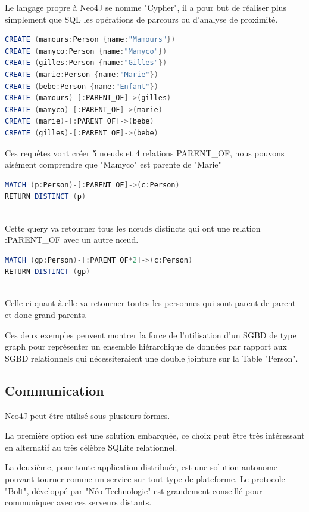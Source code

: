 \documentclass[a4paper,fleqn,12pt]{report}
\begin{document}
Le langage propre à Neo4J se nomme "Cypher"\label{Cypher}, il a pour but de réaliser plus simplement que SQL les opérations de parcours ou d'analyse de proximité.

\begin{lstlisting}[language=java, frame=single]
CREATE (mamours:Person {name:"Mamours"})
CREATE (mamyco:Person {name:"Mamyco"})
CREATE (gilles:Person {name:"Gilles"})
CREATE (marie:Person {name:"Marie"})
CREATE (bebe:Person {name:"Enfant"})
CREATE (mamours)-[:PARENT_OF]->(gilles)
CREATE (mamyco)-[:PARENT_OF]->(marie)
CREATE (marie)-[:PARENT_OF]->(bebe)
CREATE (gilles)-[:PARENT_OF]->(bebe)
\end{lstlisting}

Ces requêtes vont créer 5 nœuds et 4 relations PARENT\_OF, nous pouvons aisément comprendre que "Mamyco" est parente de "Marie"

\begin{lstlisting}[language=java, frame=single]
MATCH (p:Person)-[:PARENT_OF]->(c:Person) 
RETURN DISTINCT (p)
	
\end{lstlisting}

Cette query va retourner tous les nœuds distincts qui ont une relation :PARENT\_OF avec un autre nœud.

\begin{lstlisting}[language=java, frame=single]
MATCH (gp:Person)-[:PARENT_OF*2]->(c:Person) 
RETURN DISTINCT (gp)
	
\end{lstlisting}

Celle-ci quant à elle va retourner toutes les personnes qui sont parent de parent et donc grand-parents. 

Ces deux exemples peuvent montrer la force de l’utilisation d’un SGBD de type graph pour représenter un ensemble hiérarchique de données par rapport aux SGBD relationnels qui nécessiteraient une double jointure sur la Table "Person".

\subsection{Communication}

Neo4J peut être utilisé sous plusieurs formes.

La première option est une solution embarquée, ce choix peut être très intéressant en alternatif au très célèbre SQLite relationnel.

La deuxième, pour toute application distribuée, est une solution autonome pouvant tourner comme un service sur tout type de plateforme. Le protocole "Bolt", développé par "Néo Technologie" est grandement conseillé pour communiquer avec ces serveurs distants.
\end{document}
